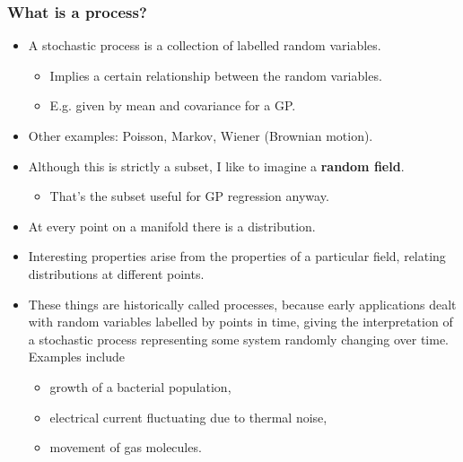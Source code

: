 \begin{frame} \frametitle{What is a process?}
\begin{itemize}
  \item A stochastic process is a collection of labelled random variables.
  \begin{itemize}
    \item Implies a certain relationship between the random variables.
    \item E.g. given by mean and covariance for a GP.
  \end{itemize}
  \item Other examples: Poisson, Markov, Wiener (Brownian motion).
  \vspace{4mm}
  \item Although this is strictly a subset,
    I like to imagine a \textbf{random field}.
  \begin{itemize}
    \item That's the subset useful for GP regression anyway.
  \end{itemize}
  \item At every point on a manifold there is a distribution.
  \item Interesting properties arise from the properties of a particular field,
    relating distributions at different points.
  \vspace{4mm}
  \item These things are historically called processes, because early
    applications dealt with random variables labelled by points in time,
    giving the interpretation of a stochastic process representing
    some system randomly changing over time. Examples include
  \begin{itemize}
    \item growth of a bacterial population,
    \item electrical current fluctuating due to thermal noise,
    \item movement of gas molecules.
  \end{itemize}
\end{itemize}
\end{frame}

